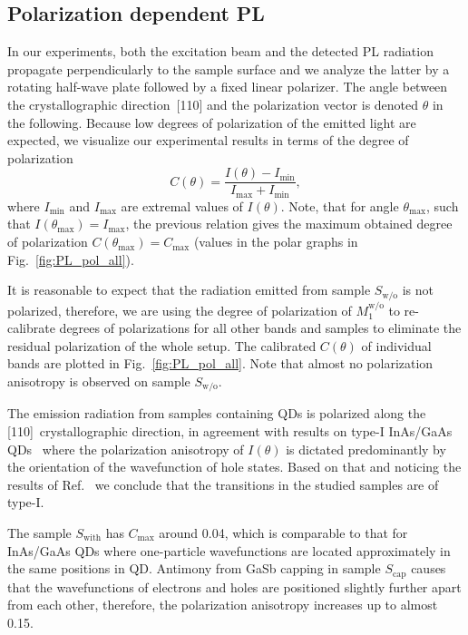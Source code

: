 \subsection{Polarization dependent PL }
In our experiments, both the excitation beam and the detected PL radiation propagate perpendicularly to the sample surface and we analyze the latter by a rotating half-wave plate followed by a fixed linear polarizer. The angle between the crystallographic direction~[110] and the polarization vector is denoted $\theta$ in the following. Because low degrees of polarization of the emitted light are expected, we visualize our experimental results in terms of the degree of polarization
%
\begin{equation}
C(\theta)=\frac{I(\theta)-I_\mathrm{min}}{I_\mathrm{max}+I_\mathrm{min}},
\end{equation}
%
where $I_\mathrm{min}$ and $I_\mathrm{max}$ are extremal values of $I(\theta)$. Note, that for angle $\theta_\mathrm{max}$, such that $I(\theta_\mathrm{max})=I_\mathrm{max}$, the previous relation gives the maximum obtained degree of polarization $C(\theta_\mathrm{max})=C_\mathrm{max}$ (values in the polar graphs in Fig.~\ref{fig:PL_pol_all}).

It is reasonable to expect that the radiation emitted from sample ${S_\mathrm{w/o}}$ is not polarized, therefore, we are using the degree of polarization of $M_1^\mathrm{w/o}$ to re-calibrate degrees of polarizations for all other bands and samples to eliminate the residual polarization of the whole setup. The calibrated $C(\theta)$ of individual bands are plotted in Fig.~\ref{fig:PL_pol_all}. Note that almost no polarization anisotropy is observed on sample ${S_\mathrm{w/o}}$.

The emission radiation from samples containing QDs is polarized along the [110]~crystallographic direction, in agreement with results on type-I InAs/GaAs QDs~\citep{HumPhysE} where the polarization anisotropy of $I(\theta)$ is dictated predominantly by the orientation of the wavefunction of hole states. Based on that and noticing the results of Ref.~\citep{Klenovsky2015} we conclude that the transitions in the studied samples are of type-I.

  The sample ${S_\mathrm{with}}$ has $C_\mathrm{max}$ around 0.04, which is comparable to that for InAs/GaAs QDs where one-particle wavefunctions are located approximately in the same positions in QD. Antimony from GaSb capping in sample ${S_\mathrm{cap}}$ causes that the wavefunctions of electrons and holes are positioned slightly further apart from each other, therefore, the polarization anisotropy increases up to almost 0.15.
  
